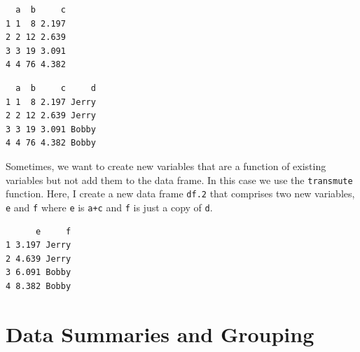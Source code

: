 \documentclass[]{krantz}
\makeatletter
\newenvironment{Shaded}{\begin{snugshade}}{\end{snugshade}}
\newcommand{\KeywordTok}[1]{\textcolor[rgb]{0.27,0.27,0.27}{\textbf{#1}}}
\newcommand{\DataTypeTok}[1]{\textcolor[rgb]{0.27,0.27,0.27}{#1}}
\newcommand{\DecValTok}[1]{\textcolor[rgb]{0.06,0.06,0.06}{#1}}
\newcommand{\StringTok}[1]{\textcolor[rgb]{0.5,0.5,0.5}{#1}}
\newcommand{\OperatorTok}[1]{\textcolor[rgb]{0.43,0.43,0.43}{\textbf{#1}}}
\newcommand{\NormalTok}[1]{#1}
\newenvironment{kframe}{%
\medskip{}
\setlength{\fboxsep}{.8em}
 \def\at@end@of@kframe{}%
 \ifinner\ifhmode%
  \def\at@end@of@kframe{\end{minipage}}%
  \begin{minipage}{\columnwidth}%
 \fi\fi%
 \def\FrameCommand##1{\hskip\@totalleftmargin \hskip-\fboxsep
 \colorbox{shadecolor}{##1}\hskip-\fboxsep
     \hskip-\linewidth \hskip-\@totalleftmargin \hskip\columnwidth}%
 \MakeFramed {\advance\hsize-\width
   \@totalleftmargin\z@ \linewidth\hsize
   \@setminipage}}%
 {\par\unskip\endMakeFramed%
 \at@end@of@kframe}
\renewenvironment{Shaded}{\begin{kframe}}{\end{kframe}}
\theoremstyle{definition}
\theoremstyle{definition}
\theoremstyle{definition}
\theoremstyle{remark}
\makeatother
\begin{document}
\begin{verbatim}
  a  b     c
1 1  8 2.197
2 2 12 2.639
3 3 19 3.091
4 4 76 4.382
\end{verbatim}

\begin{Shaded}
\end{Shaded}

\begin{verbatim}
  a  b     c     d
1 1  8 2.197 Jerry
2 2 12 2.639 Jerry
3 3 19 3.091 Bobby
4 4 76 4.382 Bobby
\end{verbatim}

Sometimes, we want to create new variables that are a function of
existing variables but not add them to the data frame. In this case we
use the \texttt{transmute} function. Here, I create a new data frame
\texttt{df.2} that comprises two new variables, \texttt{e} and
\texttt{f} where \texttt{e} is \texttt{a+c} and \texttt{f} is just a
copy of \texttt{d}.

\begin{Shaded}
\end{Shaded}

\begin{verbatim}
      e     f
1 3.197 Jerry
2 4.639 Jerry
3 6.091 Bobby
4 8.382 Bobby
\end{verbatim}

\section{Data Summaries and Grouping}\label{data-summaries-and-grouping}
\end{document}
